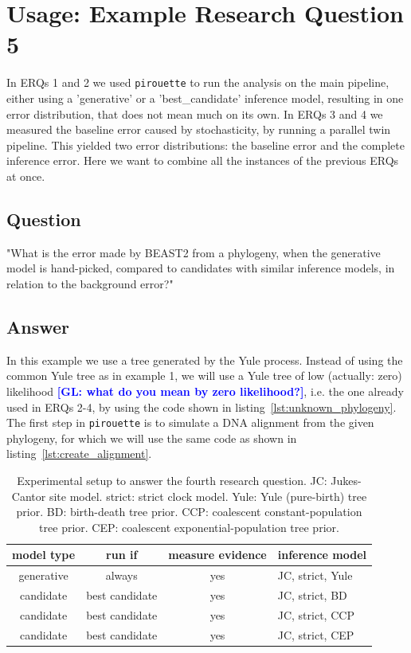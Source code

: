 \documentclass{article}
\newcommand{\giovanni}[1]{\textcolor{blue}{\textbf{[GL: #1]}}}
\begin{document}
\section{Usage: Example Research Question 5}

In ERQs 1 and 2 we used \verb;pirouette; to  
run the analysis on the main pipeline, either using a 'generative' or a 
'best\_candidate' inference model, resulting in one error distribution,
that does not mean much on its own.
In ERQs 3 and 4 we measured the baseline error caused by stochasticity,
by running a parallel twin pipeline. This yielded two error distributions:
the baseline error and the complete inference error. Here we want to combine all the instances of the previous ERQs at once.

\subsection{Question}

"What is the error made by BEAST2 from a phylogeny, 
when the generative model is hand-picked, 
compared to candidates with similar inference models, 
in relation to the background error?"

\subsection{Answer}

In this example we use a tree generated by the Yule process.
Instead of using the common Yule tree as in example 1, we will use
a Yule tree of low (actually: zero) likelihood \giovanni{what do you mean by zero likelihood?}, i.e. the one already used in ERQs 2-4, by using the code shown in listing~\ref{lst:unknown_phylogeny}.
The first step in \verb;pirouette; is to simulate a DNA alignment 
from the given phylogeny, for which we will use the same code 
as shown in listing~\ref{lst:create_alignment}.

\begin{table}
  \begin{tabular}{ | c | c | c | l | }
    \hline
    \textbf{model type} & \textbf{run if} & \textbf{measure evidence} & 
\textbf{inference model} \\ 
    \hline
    generative & always         & yes & JC, strict, Yule \\
    candidate  & best candidate & yes & JC, strict, BD \\
    candidate  & best candidate & yes & JC, strict, CCP \\
    candidate  & best candidate & yes & JC, strict, CEP \\
    \hline
  \end{tabular}
  \caption{
    Experimental setup to answer the fourth research question.
    JC: Jukes-Cantor site model.
    strict: strict clock model.
    Yule: Yule (pure-birth) tree prior.
    BD: birth-death tree prior.
    CCP: coalescent constant-population tree prior.
    CEP: coalescent exponential-population tree prior.
  }
  \label{tab:experiment_5}
\end{table}
\end{document}
